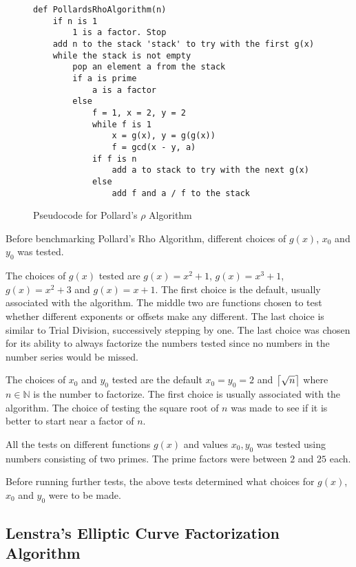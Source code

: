  \begin{figure}[H]
    \centering
    \begin{minipage}{0.5\textwidth}
        \begin{verbatim}
def PollardsRhoAlgorithm(n)
    if n is 1
        1 is a factor. Stop
    add n to the stack 'stack' to try with the first g(x)
    while the stack is not empty
        pop an element a from the stack
        if a is prime
            a is a factor
        else
            f = 1, x = 2, y = 2
            while f is 1
                x = g(x), y = g(g(x))
                f = gcd(x - y, a)
            if f is n
                add a to stack to try with the next g(x)
            else
                add f and a / f to the stack
        \end{verbatim}
    \end{minipage}
    \caption{Pseudocode for Pollard's $\rho$ Algorithm}
    \label{fig:pollardsRhoAlgorithm}
\end{figure}

Before benchmarking Pollard's Rho Algorithm, different choices of $g(x)$, $x_0$ and $y_0$ was tested.

The choices of $g(x)$ tested are $g(x)=x^2+1$, $g(x)=x^3+1$, $g(x)=x^2+3$ and $g(x)=x+1$. The first choice is the default, usually associated with the algorithm. The middle two are functions chosen to test whether different exponents or offsets make any different. The last choice is similar to Trial Division, successively stepping by one. The last choice was chosen for its ability to always factorize the numbers tested since no numbers in the number series would be missed.

The choices of $x_0$ and $y_0$ tested are the default $x_0=y_0=2$ and $\ceil[\big]{\sqrt{n}}$ where $n\in\mathbb{N}$ is the number to factorize. The first choice is usually associated with the algorithm. The choice of testing the square root of $n$ was made to see if it is better to start near a factor of $n$.

All the tests on different functions $g(x)$ and values $x_0, y_0$ was tested using numbers consisting of two primes. The prime factors were between $2$ and $25$ each.

Before running further tests, the above tests determined what choices for $g(x)$, $x_0$ and $y_0$ were to be made.

\subsection{Lenstra's Elliptic Curve Factorization Algorithm}

